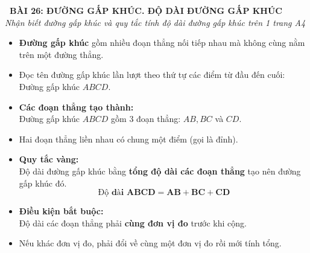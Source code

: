 \documentclass[11pt,a4paper]{article}
\begin{document}
\begin{tcolorbox}[
  enhanced,
  colback=violet!8!white,
  colframe=violet!70!black,
  arc=3mm, boxrule=1.2pt,
  left=3mm, right=3mm, top=2mm, bottom=2mm,
  halign=center
]
  {\LARGE\bfseries\color{violet!90!black}\faBookmark\ BÀI 26: ĐƯỜNG GẤP KHÚC. ĐỘ DÀI ĐƯỜNG GẤP KHÚC}\\[1mm]
  {\itshape\footnotesize\color{black!75} Nhận biết đường gấp khúc và quy tắc tính độ dài đường gấp khúc trên 1 trang A4}
\end{tcolorbox}

\vspace{-2mm}

\noindent
\begin{minipage}[t]{0.49\textwidth}\vspace{0pt}
\begin{tcolorbox}[
  enhanced,
  colback=violet!4!white,
  colframe=violet!75!black,
  arc=2mm, boxrule=0.8pt,
  left=2mm, right=2mm, top=1.8mm, bottom=1.8mm,
  title={\footnotesize\bfseries\color{white}\faKey\ 1. Khái niệm đường gấp khúc}
]
{\footnotesize
\begin{itemize}\setlength{\itemsep}{1pt}\setlength{\leftskip}{-2.5mm}
  \item \textbf{Đường gấp khúc} gồm nhiều đoạn thẳng nối tiếp nhau mà không cùng nằm trên một đường thẳng.
  \item Đọc tên đường gấp khúc lần lượt theo thứ tự các điểm từ đầu đến cuối: Đường gấp khúc $ABCD$.
  \item \textbf{Các đoạn thẳng tạo thành:}\\
  Đường gấp khúc $ABCD$ gồm $3$ đoạn thẳng: $AB, BC$ và $CD$.
  \item Hai đoạn thẳng liền nhau có chung một điểm (gọi là đỉnh).
\end{itemize}
}
\end{tcolorbox}
\end{minipage}
\hfill
\begin{minipage}[t]{0.49\textwidth}\vspace{0pt}
\begin{tcolorbox}[
  enhanced,
  colback=teal!4!white,
  colframe=teal!75!black,
  arc=2mm, boxrule=0.8pt,
  left=2mm, right=2mm, top=1.8mm, bottom=1.8mm,
  title={\footnotesize\bfseries\color{white}\faSliders\ 2. Tính độ dài đường gấp khúc}
]
{\footnotesize
\begin{itemize}\setlength{\itemsep}{1pt}\setlength{\leftskip}{-2.5mm}
  \item \textbf{Quy tắc vàng:}\\
  Độ dài đường gấp khúc bằng \textbf{tổng độ dài các đoạn thẳng} tạo nên đường gấp khúc đó.
  $$\mathbf{\text{Độ dài } ABCD = AB + BC + CD}$$
  \item \textbf{Điều kiện bắt buộc:}\\
  Độ dài các đoạn thẳng phải \textbf{cùng đơn vị đo} trước khi cộng.
  \item Nếu khác đơn vị đo, phải đổi về cùng một đơn vị đo rồi mới tính tổng.
\end{itemize}
}
\end{tcolorbox}
\end{minipage}
\end{document}
